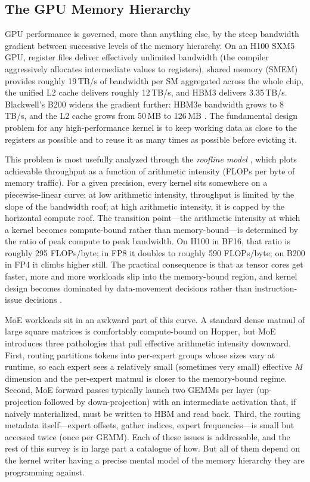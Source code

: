 \documentclass[10pt]{article}
\begin{document}
\subsection{The GPU Memory Hierarchy}
\label{sec:hw-memhier}

GPU performance is governed, more than anything else, by the steep bandwidth gradient between successive levels of the memory hierarchy. On an H100 SXM5 GPU, register files deliver effectively unlimited bandwidth (the compiler aggressively allocates intermediate values to registers), shared memory (SMEM) provides roughly 19\,TB/s of bandwidth per SM aggregated across the whole chip, the unified L2 cache delivers roughly 12\,TB/s, and HBM3 delivers 3.35\,TB/s. Blackwell's B200 widens the gradient further: HBM3e bandwidth grows to 8\,TB/s, and the L2 cache grows from 50\,MB to 126\,MB \citep{nvidia2022hopper,nvidia2024blackwell}. The fundamental design problem for any high-performance kernel is to keep working data as close to the registers as possible and to reuse it as many times as possible before evicting it.

This problem is most usefully analyzed through the \emph{roofline model} \citep{williams2009roofline}, which plots achievable throughput as a function of arithmetic intensity (FLOPs per byte of memory traffic). For a given precision, every kernel sits somewhere on a piecewise-linear curve: at low arithmetic intensity, throughput is limited by the slope of the bandwidth roof; at high arithmetic intensity, it is capped by the horizontal compute roof. The transition point---the arithmetic intensity at which a kernel becomes compute-bound rather than memory-bound---is determined by the ratio of peak compute to peak bandwidth. On H100 in BF16, that ratio is roughly 295 FLOPs/byte; in FP8 it doubles to roughly 590 FLOPs/byte; on B200 in FP4 it climbs higher still. The practical consequence is that as tensor cores get faster, more and more workloads slip into the memory-bound region, and kernel design becomes dominated by data-movement decisions rather than instruction-issue decisions \citep{boehm2022cudammm,gordic2024matmul}.

MoE workloads sit in an awkward part of this curve. A standard dense matmul of large square matrices is comfortably compute-bound on Hopper, but MoE introduces three pathologies that pull effective arithmetic intensity downward. First, routing partitions tokens into per-expert groups whose sizes vary at runtime, so each expert sees a relatively small (sometimes very small) effective $M$ dimension and the per-expert matmul is closer to the memory-bound regime. Second, MoE forward passes typically launch two GEMMs per layer (up-projection followed by down-projection) with an intermediate activation that, if naively materialized, must be written to HBM and read back. Third, the routing metadata itself---expert offsets, gather indices, expert frequencies---is small but accessed twice (once per GEMM). Each of these issues is addressable, and the rest of this survey is in large part a catalogue of how. But all of them depend on the kernel writer having a precise mental model of the memory hierarchy they are programming against.
\end{document}
